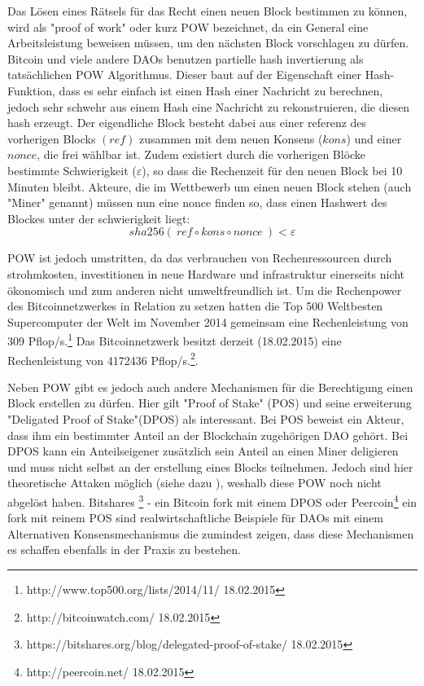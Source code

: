 \documentclass[a4paper,12pt]{report}
\begin{document}
Das Lösen eines Rätsels für das Recht einen neuen Block bestimmen zu können, wird als "proof of work" oder kurz POW bezeichnet, da ein General eine Arbeitsleistung beweisen müssen, um den nächsten Block vorschlagen zu dürfen. Bitcoin und viele andere DAOs benutzen partielle hash invertierung als tatsächlichen POW Algorithmus. Dieser baut auf der Eigenschaft einer Hash-Funktion, dass es sehr einfach ist einen Hash einer Nachricht zu berechnen, jedoch sehr schwehr aus einem Hash eine Nachricht zu rekonstruieren, die diesen hash erzeugt. Der eigendliche Block besteht dabei aus einer referenz des vorherigen Blocks $(ref)$ zusammen mit dem neuen Konsens ($kons$) und einer $nonce$, die frei wählbar ist. Zudem existiert durch die vorherigen Blöcke bestimmte Schwierigkeit ($\varepsilon$), so dass die Rechenzeit für den neuen Block bei 10 Minuten bleibt. Akteure, die im Wettbewerb um einen neuen Block stehen (auch "Miner" genannt) müssen nun eine nonce finden so, dass einen Hashwert des Blockes unter der schwierigkeit liegt:
\[ sha256(\ ref\circ kons\circ nonce\ ) < \varepsilon \] 

POW ist jedoch umstritten, da das verbrauchen von Rechenressourcen durch strohmkosten, investitionen in neue Hardware und infrastruktur einerseits nicht ökonomisch und zum anderen nicht umweltfreundlich ist. Um die Rechenpower des Bitcoinnetzwerkes in Relation zu setzen hatten die Top 500 Weltbesten Supercomputer der Welt im November 2014 gemeinsam eine Rechenleistung von 309 Pflop/s.\footnote{http://www.top500.org/lists/2014/11/ 18.02.2015} Das Bitcoinnetzwerk besitzt derzeit (18.02.2015) eine Rechenleistung von 4172436 Pflop/s.\footnote{http://bitcoinwatch.com/ 18.02.2015}.


Neben POW gibt es jedoch auch andere Mechanismen für die Berechtigung einen Block erstellen zu dürfen. Hier gilt "Proof of Stake" (POS) und seine erweiterung "Deligated Proof of Stake"(DPOS) als interessant. Bei POS beweist ein Akteur, dass ihm ein bestimmter Anteil an der Blockchain zugehörigen DAO gehört. Bei  DPOS kann ein Anteilseigener zusätzlich sein Anteil an einen Miner deligieren und muss nicht selbst an der erstellung eines Blocks teilnehmen. Jedoch sind hier theoretische Attaken möglich (siehe dazu \cite{EthereumBlogPOS} \cite{Vasant2015}), weshalb diese POW noch nicht abgelöst haben. Bitshares \footnote{https://bitshares.org/blog/delegated-proof-of-stake/ 18.02.2015} - ein Bitcoin fork mit einem DPOS oder Peercoin\footnote{http://peercoin.net/ 18.02.2015} ein fork mit reinem POS sind realwirtschaftliche Beispiele für DAOs mit einem Alternativen Konsensmechanismus die zumindest zeigen, dass diese Mechanismen es schaffen ebenfalls in der Praxis zu bestehen.
\end{document}
